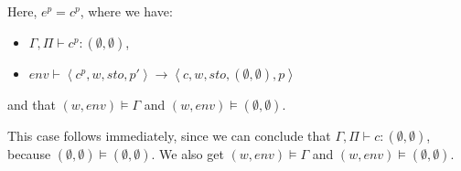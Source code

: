 \item[\runa{Cons}] Here, $e^p=c^p$, where we have:
			\begin{itemize}
				\item $\Gamma,\Pi\vdash c^p :(\emptyset,\emptyset)$,
				\item $env\vdash\left\langle c^p,w,sto,p'\right\rangle\rightarrow\left\langle c,w,sto,(\emptyset,\emptyset),p\right\rangle$
			\end{itemize}
			and that $(w,env)\models\Gamma$ and $(w,env)\models(\emptyset,\emptyset)$.

			This case follows immediately, since we can conclude that $\Gamma,\Pi\vdash c:(\emptyset,\emptyset)$, because $(\emptyset,\emptyset)\models(\emptyset,\emptyset)$.
			We also get $(w,env)\models\Gamma$ and $(w,env)\models(\emptyset,\emptyset)$.

